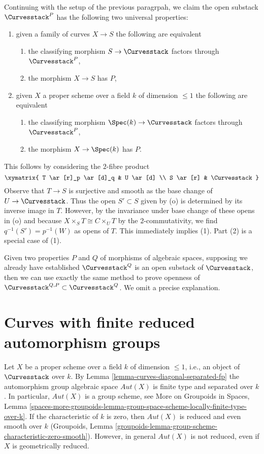 \medskip\noindent
Continuing with the setup of the previous paragrpah, we claim
the open substack $\Curvesstack^P$ has the following two universal properties:
\begin{enumerate}
\item given a family of curves $X \to S$ the following are equivalent
\begin{enumerate}
\item the classifying morphism $S \to \Curvesstack$ factors through
$\Curvesstack^P$,
\item the morphism $X \to S$ has $P$,
\end{enumerate}
\item given $X$ a proper scheme over a field $k$ of dimension $\leq 1$
the following are equivalent
\begin{enumerate}
\item the classifying morphism $\Spec(k) \to \Curvesstack$ factors
through $\Curvesstack^P$,
\item the morphism $X \to \Spec(k)$ has $P$.
\end{enumerate}
\end{enumerate}
This follows by considering the $2$-fibre product
$$
\xymatrix{
T \ar[r]_p \ar[d]_q & U \ar[d] \\
S \ar[r] & \Curvesstack
}
$$
Observe that $T \to S$ is surjective and smooth as the base
change of $U \to \Curvesstack$. Thus the open $S' \subset S$
given by (o) is determined by its inverse image in $T$.
However, by the invariance under base change of these opens in (o) 
and because $X \times_S T \cong C \times_U T$ by the $2$-commutativity,
we find $q^{-1}(S') = p^{-1}(W)$ as opens of $T$.
This immediately implies (1). Part (2) is a special case of (1).

\medskip\noindent
Given two properties $P$ and $Q$ of morphisms of algebraic spaces,
supposing we already have established $\Curvesstack^Q$ is
an open substack of $\Curvesstack$, then we can use exactly
the same method to prove openness of
$\Curvesstack^{Q, P} \subset \Curvesstack^Q$.
We omit a precise explanation.



\section{Curves with finite reduced automorphism groups}
\label{section-finite-aut}

\noindent
Let $X$ be a proper scheme over a field $k$ of dimension $\leq 1$, i.e.,
an object of $\Curvesstack$ over $k$.
By Lemma \ref{lemma-curves-diagonal-separated-fp}
the automorphism group algebraic space $\mathit{Aut}(X)$
is finite type and separated over $k$.
In particular, $\mathit{Aut}(X)$ is a group scheme, see
More on Groupoids in Spaces, Lemma
\ref{spaces-more-groupoids-lemma-group-space-scheme-locally-finite-type-over-k}.
If the characteristic of $k$ is zero, then $\mathit{Aut}(X)$
is reduced and even smooth over $k$ (Groupoids, Lemma
\ref{groupoids-lemma-group-scheme-characteristic-zero-smooth}).
However, in general $\mathit{Aut}(X)$ is not reduced, even
if $X$ is geometrically reduced.

